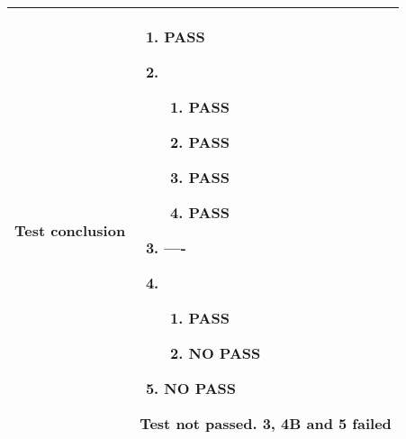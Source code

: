 \documentclass[a4paper]{article}
\begin{document}
\begin{center}
\begin{tabular}{ |  p{3cm} | p{7cm} | }
			Test conclusion & 	\begin{enumerate}
							\item PASS
							\item 
							\begin{enumerate}
								\item PASS
								\item PASS
								\item PASS
								\item PASS
							\end{enumerate}
							\item ----
							\item  
							\begin{enumerate}
								\item PASS
								\item NO PASS
							\end{enumerate}
							\item NO PASS
						\end{enumerate}
						Test not passed. 3, 4B and 5 failed \\  [5pt] \hline
		\end{tabular}
	\end{center}
\end{document}
